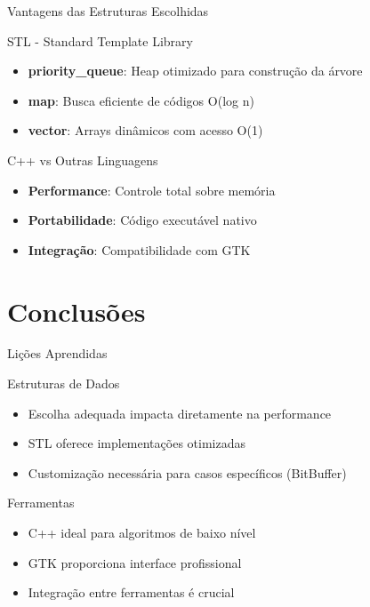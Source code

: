 \documentclass{beamer}
\begin{document}
\begin{frame}{Vantagens das Estruturas Escolhidas}
    \begin{block}{STL - Standard Template Library}
        \begin{itemize}
            \item \textbf{priority\_queue}: Heap otimizado para construção da árvore
            \item \textbf{map}: Busca eficiente de códigos O(log n)
            \item \textbf{vector}: Arrays dinâmicos com acesso O(1)
        \end{itemize}
    \end{block}
    \begin{block}{C++ vs Outras Linguagens}
        \begin{itemize}
            \item \textbf{Performance}: Controle total sobre memória
            \item \textbf{Portabilidade}: Código executável nativo
            \item \textbf{Integração}: Compatibilidade com GTK
        \end{itemize}
    \end{block}
\end{frame}

\section{Conclusões}
\begin{frame}{Lições Aprendidas}
    \begin{block}{Estruturas de Dados}
        \begin{itemize}
            \item Escolha adequada impacta diretamente na performance
            \item STL oferece implementações otimizadas
            \item Customização necessária para casos específicos (BitBuffer)
        \end{itemize}
    \end{block}
    \begin{block}{Ferramentas}
        \begin{itemize}
            \item C++ ideal para algoritmos de baixo nível
            \item GTK proporciona interface profissional
            \item Integração entre ferramentas é crucial
        \end{itemize}
    \end{block}
\end{frame}
\end{document}
